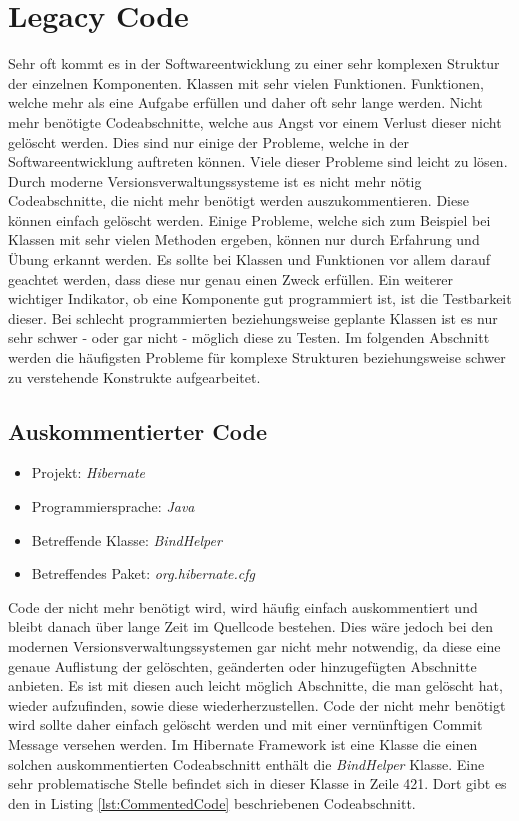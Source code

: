 \section{Legacy Code}

\SuperPar Sehr oft kommt es in der Softwareentwicklung zu einer sehr komplexen Struktur der einzelnen Komponenten. Klassen mit sehr vielen Funktionen. Funktionen, welche mehr als eine Aufgabe erfüllen und daher oft sehr lange werden. Nicht mehr benötigte Codeabschnitte, welche aus Angst vor einem Verlust dieser nicht gelöscht werden. Dies sind nur einige der Probleme, welche in der Softwareentwicklung auftreten können. Viele dieser Probleme sind leicht zu lösen. Durch moderne Versionsverwaltungssysteme ist es nicht mehr nötig Codeabschnitte, die nicht mehr benötigt werden auszukommentieren. Diese können einfach gelöscht werden. Einige Probleme, welche sich zum Beispiel bei Klassen mit sehr vielen Methoden ergeben, können nur durch Erfahrung und Übung erkannt werden. Es sollte bei Klassen und Funktionen vor allem darauf geachtet werden, dass diese nur genau einen Zweck erfüllen. Ein weiterer wichtiger Indikator, ob eine Komponente gut programmiert ist, ist die Testbarkeit dieser. Bei schlecht programmierten beziehungsweise geplante Klassen ist es nur sehr schwer - oder gar nicht - möglich diese zu Testen. Im folgenden Abschnitt werden die häufigsten Probleme für komplexe Strukturen beziehungsweise schwer zu verstehende Konstrukte aufgearbeitet.

\subsection{Auskommentierter Code}
\begin{itemize}
	\item Projekt: \textit{Hibernate}
	\item Programmiersprache: \textit{Java}
	\item Betreffende Klasse: \textit{BindHelper}
	\item Betreffendes Paket: \textit{org.hibernate.cfg}
\end{itemize}


\SuperPar Code der nicht mehr benötigt wird, wird häufig einfach auskommentiert und bleibt danach über lange Zeit im Quellcode bestehen. Dies wäre jedoch bei den modernen Versionsverwaltungssystemen gar nicht mehr notwendig, da diese eine genaue Auflistung der gelöschten, geänderten oder hinzugefügten Abschnitte anbieten. Es ist mit diesen auch leicht möglich Abschnitte, die man gelöscht hat, wieder aufzufinden, sowie diese wiederherzustellen. Code der nicht mehr benötigt wird sollte daher einfach gelöscht werden und mit einer vernünftigen Commit Message versehen werden. Im Hibernate Framework ist eine Klasse die einen solchen auskommentierten Codeabschnitt enthält die \textit{BindHelper} Klasse. Eine sehr problematische Stelle befindet sich in dieser Klasse in Zeile 421. Dort gibt es den in Listing \ref{lst:CommentedCode} beschriebenen Codeabschnitt.

